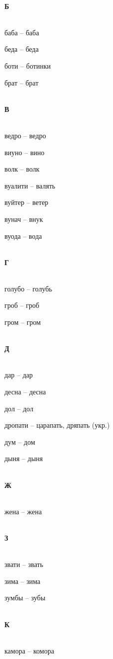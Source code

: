 \begin{multicols}{2}

\mbox{ }\\
\textbf{Б}\\
\mbox{ }

баба – баба

беда – беда

боти – ботинки

брат – брат

\mbox{ }\\
\textbf{В}\\
\mbox{ }

ведро – ведро

виуно – вино

волк – волк

вуалити – валять

вуйтер – ветер

вунач – внук

вуода – вода

\mbox{ }\\
\textbf{Г}\\
\mbox{ }

голубо – голубь

гроб – гроб

гром – гром

\mbox{ }\\
\textbf{Д}\\
\mbox{ }

дар – дар

десна – десна

дол – дол

дропати – царапать, дряпать (укр.)

дум – дом

дыня – дыня

\mbox{ }\\
\textbf{Ж}\\
\mbox{ }

жена – жена

\mbox{ }\\
\textbf{З}\\
\mbox{ }

звати – звать

зима – зима

зумбы – зубы

\mbox{ }\\
\textbf{К}\\
\mbox{ }

камора – комора


\end{multicols}
